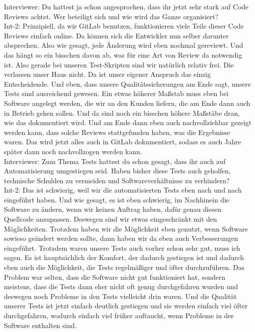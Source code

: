 Interviewer: Du hattest ja schon angesprochen, dass ihr jetzt sehr stark auf Code Reviews achtet. Wer beteiligt sich und wie wird das Ganze organisiert?\\
Int-2: Prinzipiell, da wir GitLab benutzen, funktionieren viele Teile dieser Code Reviews einfach online. Da können sich die Entwickler nun selber darunter absprechen. Also wie gesagt, jede Änderung wird eben nochmal gereviewt. Und das hängt so ein bisschen davon ab, was für eine Art von Review da notwendig ist. Also gerade bei unseren Test-Skripten sind wir natürlich relativ frei. Die verlassen unser Haus nicht. Da ist unser eigener Anspruch das einzig Entscheidende. Und eben, dass unsere Qualitätssicherungen am Ende sagt, unsere Tests sind ausreichend gewesen. Ein etwas höherer Maßstab muss eben bei Software angelegt werden, die wir an den Kunden liefern, die am Ende dann auch in Betrieb gehen sollen. Und da sind noch ein bisschen höhere Maßstäbe dran, wie das dokumentiert wird. Und am Ende dann eben auch nachvollziehbar gezeigt werden kann, dass solche Reviews stattgefunden haben, was die Ergebnisse waren. Das wird jetzt alles auch in GitLab dokumentiert, sodass es auch Jahre später dann noch nachvollzogen werden kann.\\
Interviewer: Zum Thema Tests hattest du schon gesagt, dass ihr auch auf Automatisierung umgestiegen seid. Haben bisher diese Tests auch geholfen, technische Schulden zu vermeiden und Softwareverhältnisse zu verhindern? \\
Int-2: Das ist schwierig, weil wir die automatisierten Tests eben nach und nach eingeführt haben. Und wie gesagt, es ist eben schwierig, im Nachhinein die Software zu ändern, wenn wir keinen Auftrag haben, dafür genau diesen Quellcode anzupassen. Deswegen sind wir etwas eingeschränkt mit den Möglichkeiten. Trotzdem haben wir die Möglichkeit eben genutzt, wenn Software sowieso geändert werden sollte, dann haben wir da eben auch Verbesserungen eingeführt. Trotzdem waren unsere Tests auch vorher schon sehr gut, muss ich sagen. Es ist hauptsächlich der Komfort, der dadurch gestiegen ist und dadurch eben auch die Möglichkeit, die Tests regelmäßiger und öfter durchzuführen. Das Problem war selten, dass die Software nicht gut funktioniert hat, sondern meistens, dass die Tests dann eher nicht oft genug durchgefahren wurden und deswegen noch Probleme in den Tests vielleicht drin waren. Und die Qualität unserer Tests ist jetzt einfach deutlich gestiegen und sie werden einfach viel öfter durchgefahren, wodurch einfach viel früher auftaucht, wenn Probleme in der Software enthalten sind. \\
